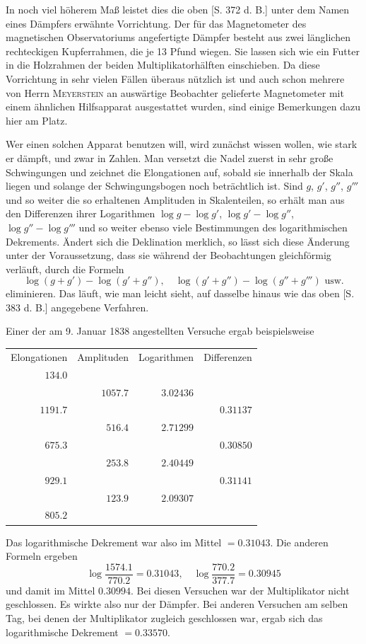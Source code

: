 In noch viel höherem Maß leistet dies die oben [S. 372 d. B.] unter dem Namen eines Dämpfers erwähnte Vorrichtung. Der für das Magnetometer des magnetischen Observatoriums angefertigte Dämpfer besteht aus zwei länglichen rechteckigen Kupferrahmen, die je 13 Pfund wiegen. Sie lassen sich wie ein Futter in die Holzrahmen der beiden Multiplikatorhälften einschieben. Da diese Vorrichtung in sehr vielen Fällen überaus nützlich ist und auch schon mehrere von Herrn \textsc{Meyerstein} an auswärtige Beobachter gelieferte Magnetometer mit einem ähnlichen Hilfsapparat ausgestattet wurden, sind einige Bemerkungen dazu hier am Platz.

Wer einen solchen Apparat benutzen will, wird zunächst wissen wollen, wie stark er dämpft, und zwar in Zahlen. Man versetzt die Nadel zuerst in sehr große Schwingungen und zeichnet die Elongationen auf, sobald sie innerhalb der Skala liegen und solange der Schwingungsbogen noch beträchtlich ist. Sind $g$, $g'$, $g''$, $g'''$ und so weiter die so erhaltenen Amplituden in Skalenteilen, so erhält man aus den Differenzen ihrer Logarithmen $\log g-\log g'$, $\log g'-\log g''$, $\log g''-\log g'''$ und so weiter ebenso viele Bestimmungen des logarithmischen Dekrements. Ändert sich die Deklination merklich, so lässt sich diese Änderung unter der Voraussetzung, dass sie während der Beobachtungen gleichförmig verläuft, durch die Formeln
\[
\log(g+g')-\log(g'+g''),\quad \log(g'+g'')-\log(g''+g''')\text{ usw.}
\]
eliminieren. Das läuft, wie man leicht sieht, auf dasselbe hinaus wie das oben [S. 383 d. B.] angegebene Verfahren.

Einer der am 9. Januar 1838 angestellten Versuche ergab beispielsweise
\begin{center}
\begin{tabular}{r|r|r|r}
Elongationen&Amplituden&Logarithmen&Differenzen\\
$134.0$&&&\\[-3pt]
&$1057.7$&$3.02436$&\\[-3pt]
$1191.7$&&&$0.31137$\\[-3pt]
&$516.4$&$2.71299$&\\[-3pt]
$675.3$&&&$0.30850$\\[-3pt]
&$253.8$&$2.40449$&\\[-3pt]
$929.1$&&&$0.31141$\\[-3pt]
&$123.9$&$2.09307$&\\[-3pt]
$805.2$&&&
\end{tabular}
\end{center}
Das logarithmische Dekrement war also im Mittel $=0.31043$. Die anderen Formeln ergeben
\[
\log\frac{1574.1}{770.2}=0.31043,\quad \log\frac{770.2}{377.7}=0.30945
\]
und damit im Mittel $0.30994$. Bei diesen Versuchen war der Multiplikator nicht geschlossen. Es wirkte also nur der Dämpfer. Bei anderen Versuchen am selben Tag, bei denen der Multiplikator zugleich geschlossen war, ergab sich das logarithmische Dekrement $=0.33570$.

